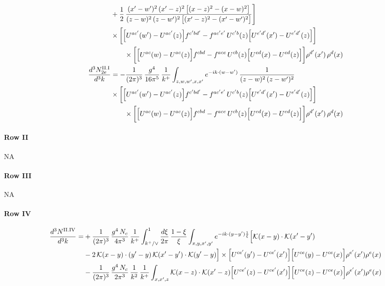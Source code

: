 \documentclass[9pt]{article}
\numberwithin{equation}{section}
\begin{document}
\begin{align}
&+\frac{1}{2}\,\frac{(x^{\prime}-w^{\prime})^{2}\,(x^{\prime}-z)^{2}\,\big[(x-z)^{2}-(x-w)^{2}\big]}{(z-w)^{2}\,(z-w^{\prime})^{2}\,\big[(x^{\prime}-z)^{2}-(x^{\prime}-w^{\prime})^{2}\big]}\Bigg]\notag\\
&\times\bigg[\Big[U^{ac'}(w')-U^{ac'}(z)\Big]f^{c'bd'}-f^{ac'e'}\,U^{c'b}(z)\Big[U^{e'd'}(x')-U^{e'd'}(z)\Big]\bigg]\notag\\&\qquad\times\bigg[\Big[U^{ac}(w)-U^{ac}(z)\Big]f^{cbd}-f^{ace}\,U^{cb}(z)\Big[U^{ed}(x)-U^{ed}(z)\Big]\bigg]\rho^{d'}(x')\,\rho^{d}(x)\\
\frac{d^{3}N^{\rm II.I}_{2e}}{d^{3}k}&= -\frac{1}{(2\pi)^{3}}\,\frac{g^{4}}{16\pi^{5}}\,\frac{1}{k^{+}}\int_{z,w,w^{\prime},x,x^{\prime}}e^{-ik\cdot{(w-w^{\prime})}}\,\frac{1}{(z-w)^{2}\,(z-w^{\prime})^{2}}\notag\\
&\times\bigg[\Big[U^{ac'}(w')-U^{ac'}(z)\Big]f^{c'bd'}-f^{ac'e'}\,U^{c'b}(z)\Big[U^{e'd'}(x')-U^{e'd'}(z)\Big]\bigg]\notag\\&\qquad\times\bigg[\Big[U^{ac}(w)-U^{ac}(z)\Big]f^{cbd}-f^{ace}\,U^{cb}(z)\Big[U^{ed}(x)-U^{ed}(z)\Big]\bigg]\rho^{d'}(x')\,\rho^{d}(x)\notag
\end{align}
\paragraph*{Row II}
\textsc{NA}
\paragraph*{Row III}
\textsc{NA}
\paragraph*{Row IV}
\begin{align}
\frac{d^{3}N^{\rm II.IV}}{d^{3}k}= &  +\frac{1}{(2\pi)^{3}}\,\frac{g^{4}\,N_{c}}{4\pi^{3}}\,\frac{1}{k^{+}}\int_{k^{+}/\vee}^{1}\frac{d\xi}{2\pi}\,\frac{1-\xi}{\xi}\int_{x,y,x',y'}e^{-ik\cdot(y-y')\frac{1}{\xi}}\Big[\mathcal{K}(x-y)\cdot\mathcal{K}(x'-y')\notag \\ & -2\,\mathcal{K}(x-y)\cdot(y'-y)\,\mathcal{K}(x'-y')\cdot\mathcal{K}(y'-y)\Big]\times\Big[U^{ce'}(y') - U^{ce'}(x')\Big]\Big[U^{ce}(y) - U^{ce}(x)\Big]\rho^{e'}(x')\rho^{e}(x)\notag \\ & -\frac{1}{(2\pi)^{3}}\,\frac{g^{4}\,N_{c}}{2\pi^{3}}\,\frac{1}{k^{2}}\,\frac{1}{k^{+}}\int_{x,x',z}\mathcal{K}(x-z)\cdot\mathcal{K}(x'-z)\Big[U^{ce'}(z)-U^{ce'}(x')\Big]\Big[U^{ce}(z)-U^{ce}(x)\Big]\rho^{e'}(x')\rho^{e}(x)
\label{eq:H-II.IVrem}
\end{align}
\end{document}
